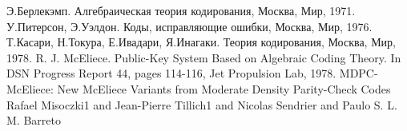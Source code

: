 \documentclass[12pt]{article}
\begin{document}
\newpage

\begin{thebibliography}{00} %
\bibitem{}
Э.Берлекэмп. Алгебраическая теория кодирования, Москва, Мир,
1971.
\bibitem{}
У.Питерсон, Э.Уэлдон. Коды, исправляющие ошибки, Москва, Мир,
1976.
\bibitem{}
Т.Касари, Н.Токура, Е.Ивадари, Я.Инагаки. Теория кодирования,
Москва, Мир, 1978.
\bibitem{}
R. J. McEliece. Public-Key System Based on Algebraic Coding Theory.
In DSN Progress Report 44, pages 114-116, Jet Propulsion Lab, 1978.
\bibitem{}
MDPC-McEliece: New McEliece Variants from
Moderate Density Parity-Check Codes
Rafael Misoczki1 and Jean-Pierre Tillich1 and
Nicolas Sendrier and Paulo S. L. M. Barreto
\end{thebibliography}
\end{document}
